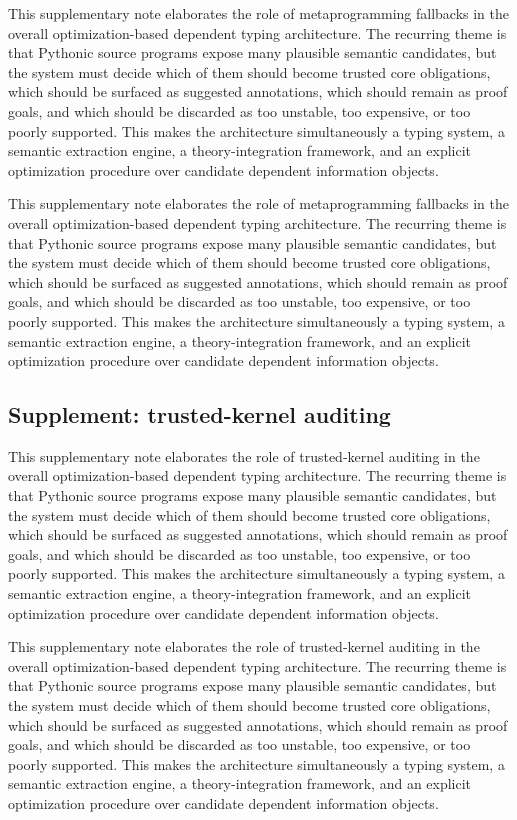 \documentclass[11pt]{article}
\theoremstyle{definition}
\theoremstyle{plain}
\begin{document}
This supplementary note elaborates the role of metaprogramming fallbacks in the overall
optimization-based dependent typing architecture. The recurring theme is that
Pythonic source programs expose many plausible semantic candidates, but the
system must decide which of them should become trusted core obligations, which
should be surfaced as suggested annotations, which should remain as proof
goals, and which should be discarded as too unstable, too expensive, or too
poorly supported. This makes the architecture simultaneously a typing system,
a semantic extraction engine, a theory-integration framework, and an explicit
optimization procedure over candidate dependent information objects.

This supplementary note elaborates the role of metaprogramming fallbacks in the overall
optimization-based dependent typing architecture. The recurring theme is that
Pythonic source programs expose many plausible semantic candidates, but the
system must decide which of them should become trusted core obligations, which
should be surfaced as suggested annotations, which should remain as proof
goals, and which should be discarded as too unstable, too expensive, or too
poorly supported. This makes the architecture simultaneously a typing system,
a semantic extraction engine, a theory-integration framework, and an explicit
optimization procedure over candidate dependent information objects.

\subsection{Supplement: trusted-kernel auditing}
This supplementary note elaborates the role of trusted-kernel auditing in the overall
optimization-based dependent typing architecture. The recurring theme is that
Pythonic source programs expose many plausible semantic candidates, but the
system must decide which of them should become trusted core obligations, which
should be surfaced as suggested annotations, which should remain as proof
goals, and which should be discarded as too unstable, too expensive, or too
poorly supported. This makes the architecture simultaneously a typing system,
a semantic extraction engine, a theory-integration framework, and an explicit
optimization procedure over candidate dependent information objects.

This supplementary note elaborates the role of trusted-kernel auditing in the overall
optimization-based dependent typing architecture. The recurring theme is that
Pythonic source programs expose many plausible semantic candidates, but the
system must decide which of them should become trusted core obligations, which
should be surfaced as suggested annotations, which should remain as proof
goals, and which should be discarded as too unstable, too expensive, or too
poorly supported. This makes the architecture simultaneously a typing system,
a semantic extraction engine, a theory-integration framework, and an explicit
optimization procedure over candidate dependent information objects.
\end{document}
